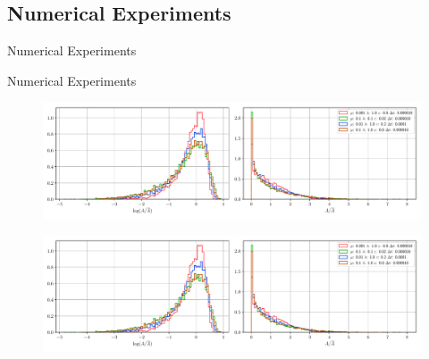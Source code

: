 \documentclass[usenames,dvipsnames]{beamer}
\begin{document}




\subsection{Numerical Experiments}

\begin{frame}{Numerical Experiments}
   \centering
\end{frame}

\begin{frame}{Numerical Experiments}
\begin{figure}
    \includegraphics[trim={0 0 44em 0},clip=true,scale=0.4]{figures/coupled_model/alt/areas.pdf}
\end{figure}
\vspace{-1.5em}
\begin{figure}
    \includegraphics[trim={43em 0 0 0},clip=true,scale=0.4]{figures/coupled_model/alt/areas.pdf}
\end{figure}
\end{frame}
\end{document}
